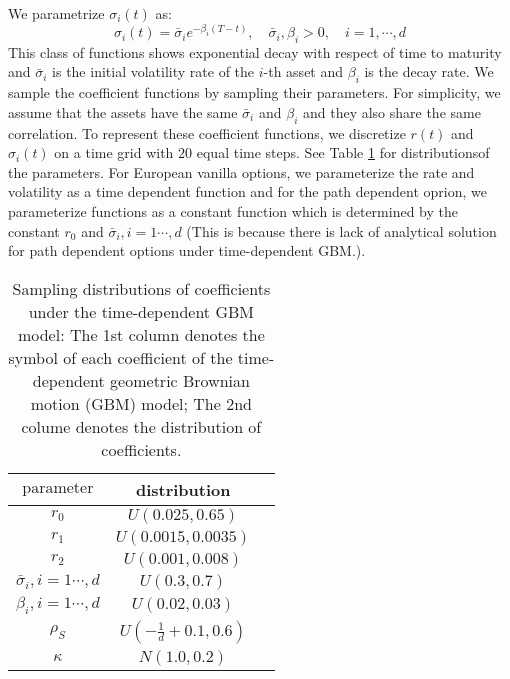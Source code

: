 \documentclass[11pt,a4paper]{article}
\theoremstyle{remark}
\begin{document}
	\noindent We parametrize $\sigma_i(t)$ as:
	\begin{equation}
		\sigma_i(t) = \bar{\sigma}_i e^{-\beta_i (T - t)},\quad \bar{\sigma}_i, \beta_i>0,\quad i=1,\cdots,d
	\end{equation}
	This class of functions shows exponential decay with respect of time to maturity and $\bar{\sigma}_i$ is the initial volatility rate of the $i$-th asset and $\beta_i$ is the decay rate. 
	We sample the coefficient functions by sampling their parameters. For simplicity, we assume that the assets have the same $\bar{\sigma}_i$ and $\beta_i$ and they also share the same correlation. To represent these coefficient functions, we discretize $r(t)$ and $\sigma_i(t)$ on a time grid with $20$ equal time steps. See Table \ref{tab:dist-TDGBM} for distributionsof the parameters. For European vanilla options, we parameterize the rate and volatility as a time dependent function and for the path dependent oprion, we parameterize functions as a constant function which is determined by the constant $r_0$ and  $\bar{\sigma}_i, i=1\cdots,d$ (This is because there is lack of analytical solution for path dependent options under time-dependent GBM.).
	\begin{table}[htbp!]
		\centering
		\begin{tabular}{ccc}
			\hline
			$\text{parameter}$    &   distribution \\
			\hline
			$r_0$     &  $U(0.025, 0.65)$\\
			$r_1$     &  $U(0.0015, 0.0035)$\\
			$r_2$     &  $U(0.001, 0.008)$\\
			$\bar{\sigma}_i, i=1\cdots,d$     &  $U(0.3, 0.7)$\\
			$\beta_i, i=1\cdots,d$    &  $U(0.02, 0.03)$\\
			$\rho_S$  & $U(-\frac{1}{d}+0.1, 0.6)$  \\
			$\kappa$  & $N(1.0, 0.2)$\\
			\hline		
		\end{tabular}%
		\caption{Sampling distributions of coefficients under the time-dependent GBM model: The 1st column denotes the symbol of each coefficient of the time-dependent geometric Brownian motion (GBM) model; The 2nd colume denotes the distribution of coefficients.}
		\label{tab:dist-TDGBM}%
	\end{table}%
	
\end{document}
